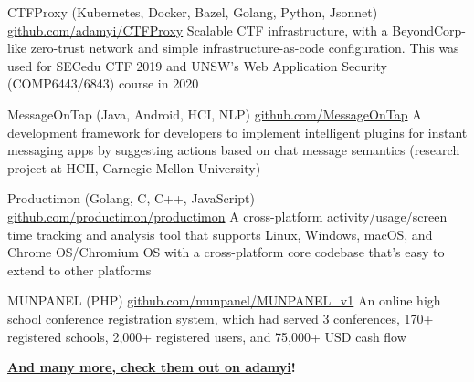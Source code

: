 \documentclass[hidelinks__VERSION__]{adamyi-cv}
\begin{document}
\begin{entrylist}


\entry
{CTFProxy (Kubernetes, Docker, Bazel, Golang, Python, Jsonnet)}
{\href{https://github.com/adamyi/CTFProxy}{github.com/adamyi/CTFProxy}}
{Scalable CTF infrastructure, with a BeyondCorp-like zero-trust network and simple infrastructure-as-code configuration. This was used for SECedu CTF 2019 and UNSW's Web Application Security (COMP6443/6843) course in 2020}


\entry
{MessageOnTap (Java, Android, HCI, NLP)}
{\href{https://github.com/MessageOnTap}{github.com/MessageOnTap}}
{A development framework for developers to implement intelligent plugins for instant messaging apps by suggesting actions based on chat message semantics (research project at HCII, Carnegie Mellon University)}


\entry
{Productimon (Golang, C, C++, JavaScript)}
{\href{https://github.com/productimon/productimon}{github.com/productimon/productimon}}
{A cross-platform activity/usage/screen time tracking and analysis tool that supports Linux, Windows, macOS, and Chrome OS/Chromium OS with a cross-platform core codebase that's easy to extend to other platforms}


\entry
{MUNPANEL (PHP)}
{\href{https://github.com/munpanel/MUNPANEL_v1}{github.com/munpanel/MUNPANEL\_v1}}
{An online high school conference registration system, which had served 3 conferences, 170+ registered schools, 2,000+ registered users, and 75,000+ USD cash flow}


\item[\textbf{\href{https://github.com/adamyi}{And many more, check them out on \faGithub \hspace{0.1em} adamyi}!}]

\end{entrylist}


\end{document}
